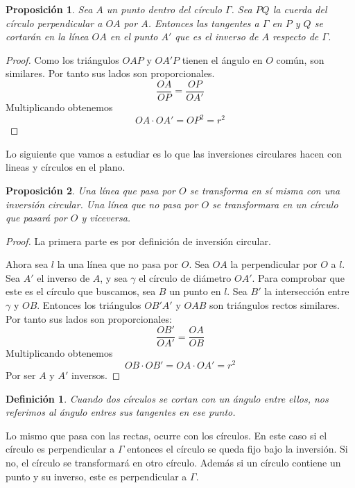 \documentclass[a4paper]{amsart}
\theoremstyle{plain}
\newtheorem{definition}{Definición}
\newtheorem{proposition}{Proposición}
\begin{document}
\begin{proposition}
Sea $A$ un punto dentro del círculo $\Gamma$. Sea $PQ$ la cuerda del círculo perpendicular a $OA$ por $A$. Entonces las tangentes a $\Gamma$ en $P$ y $Q$ se cortarán en la línea $OA$ en el punto $A'$ que es el inverso de $A$ respecto de $\Gamma$.
\end{proposition}

\begin{proof}
Como los triángulos $OAP$ y $OA'P$ tienen el ángulo en $O$ común, son similares. Por tanto sus lados son proporcionales.
\[
\frac{OA}{OP}=\frac{OP}{OA'}
\]
Multiplicando obtenemos
\[
OA\cdot OA'=OP^2=r^2
\]
\end{proof}

Lo siguiente que vamos a estudiar es lo que las inversiones circulares hacen con lineas y círculos en el plano.

\begin{proposition}
Una línea que pasa por $O$ se transforma en sí misma con una inversión circular. Una línea que no pasa por $O$ se transformara en un círculo que pasará por $O$ y viceversa.
\end{proposition}

\begin{proof}
La primera parte es por definición de inversión circular.

Ahora sea $l$ la una línea que no pasa por $O$. Sea $OA$ la perpendicular por $O$ a $l$. Sea $A'$ el inverso de $A$, y sea $\gamma$ el círculo de diámetro $OA'$. Para comprobar que este es el círculo que buscamos, sea $B$ un punto en $l$. Sea $B'$ la intersección entre $\gamma$ y $OB$. Entonces los triángulos $OB'A'$ y $OAB$ son triángulos rectos similares. Por tanto sus lados son proporcionales:
\[
\frac{OB'}{OA'}=\frac{OA}{OB}
\]
Multiplicando obtenemos
\[
OB\cdot OB'=OA\cdot OA'=r^2
\]
Por ser $A$ y $A'$ inversos.
\end{proof}

\begin{definition}
Cuando dos círculos se cortan con un ángulo entre ellos, nos referimos al ángulo entres sus tangentes en ese punto.
\end{definition}

Lo mismo que pasa con las rectas, ocurre con los círculos. En este caso si el círculo es perpendicular a $\Gamma$ entonces el círculo se queda fijo bajo la inversión. Si no, el círculo se transformará en otro círculo. Además si un círculo contiene un punto y su inverso, este es perpendicular a $\Gamma$.
\end{document}
